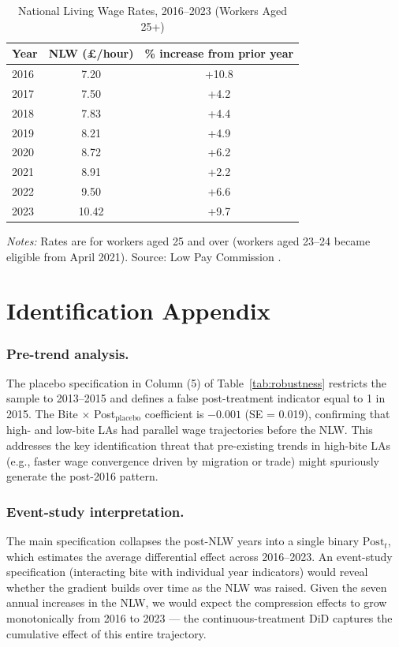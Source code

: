 \documentclass[12pt]{article}
\begin{document}
\begin{table}[H]
\centering
\caption{National Living Wage Rates, 2016--2023 (Workers Aged 25+)}
\label{tab:nlw_rates}
\small
\begin{tabular}{lcc}
\hline\hline
Year & NLW (\pounds/hour) & \% increase from prior year \\
\hline
2016 & 7.20 & +10.8 \\
2017 & 7.50 & +4.2  \\
2018 & 7.83 & +4.4  \\
2019 & 8.21 & +4.9  \\
2020 & 8.72 & +6.2  \\
2021 & 8.91 & +2.2  \\
2022 & 9.50 & +6.6  \\
2023 & 10.42 & +9.7 \\
\hline\hline
\end{tabular}
\raggedright\footnotesize\textit{Notes:} Rates are for workers aged 25 and over (workers aged 23--24 became eligible from April 2021). Source: Low Pay Commission \citeyearpar{lpc2023report}.
\end{table}

\section{Identification Appendix}
\label{sec:id_appendix}

\subsubsection*{Pre-trend analysis.}
The placebo specification in Column (5) of Table~\ref{tab:robustness} restricts the sample to 2013--2015 and defines a false post-treatment indicator equal to 1 in 2015. The Bite $\times$ Post$_{\text{placebo}}$ coefficient is $-0.001$ (SE = 0.019), confirming that high- and low-bite LAs had parallel wage trajectories before the NLW. This addresses the key identification threat that pre-existing trends in high-bite LAs (e.g., faster wage convergence driven by migration or trade) might spuriously generate the post-2016 pattern.

\subsubsection*{Event-study interpretation.}
The main specification collapses the post-NLW years into a single binary $\text{Post}_t$, which estimates the average differential effect across 2016--2023. An event-study specification (interacting bite with individual year indicators) would reveal whether the gradient builds over time as the NLW was raised. Given the seven annual increases in the NLW, we would expect the compression effects to grow monotonically from 2016 to 2023 --- the continuous-treatment DiD captures the cumulative effect of this entire trajectory.
\end{document}
